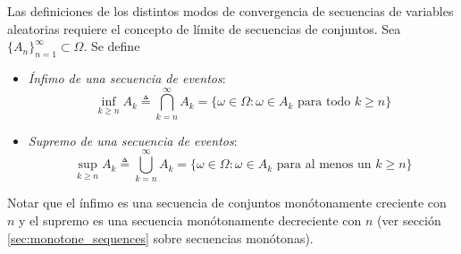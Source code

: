 \documentclass[a4paper]{report}
\begin{document}
Las definiciones de los distintos modos de convergencia de secuencias de variables aleatorias requiere el concepto de límite de secuencias de conjuntos. Sea \(\{A_n\}_{n=1}^{\infty}\subset\Omega\). Se define
\begin{itemize}
 \item \emph{Ínfimo de una secuencia de eventos}:
 \[
  \inf_{k\geq n}A_k\triangleq \bigcap_{k=n}^{\infty}A_k=\{\omega\in\Omega:\omega\in A_k\textrm{ para todo }k\geq n\}
 \]
 \item \emph{Supremo de una secuencia de eventos}:
 \[
  \sup_{k\geq n}A_k\triangleq \bigcup_{k=n}^{\infty}A_k=\{\omega\in\Omega:\omega\in A_k\textrm{ para al menos un }k\geq n\}
 \]
\end{itemize}
Notar que el ínfimo es una secuencia de conjuntos monótonamente creciente con \(n\) y el supremo es una secuencia monótonamente decreciente con \(n\) (ver sección \ref{sec:monotone_sequences} sobre secuencias monótonas).
\end{document}
